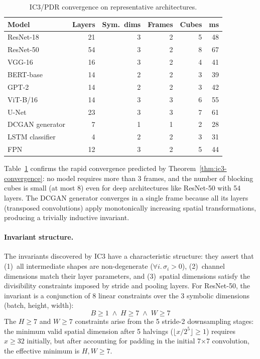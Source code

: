 \documentclass[10pt]{article}
\theoremstyle{plain}
\theoremstyle{definition}
\theoremstyle{remark}
\begin{document}
\begin{table}[t]
\centering
\caption{IC3/PDR convergence on representative architectures.}
\label{tab:ic3-convergence}
\small
\begin{tabular}{@{}lrrrrr@{}}
\toprule
\textbf{Model} & \textbf{Layers} & \textbf{Sym.\ dims} &
  \textbf{Frames} & \textbf{Cubes} & \textbf{ms} \\
\midrule
ResNet-18          & 21 & 3 & 2 & 5  & 48 \\
ResNet-50          & 54 & 3 & 2 & 8  & 67 \\
VGG-16             & 16 & 3 & 2 & 4  & 41 \\
BERT-base          & 14 & 2 & 2 & 3  & 39 \\
GPT-2              & 14 & 2 & 2 & 3  & 42 \\
ViT-B/16           & 14 & 3 & 3 & 6  & 55 \\
U-Net              & 23 & 3 & 3 & 7  & 61 \\
DCGAN generator    &  7 & 1 & 1 & 2  & 28 \\
LSTM classifier    &  4 & 2 & 2 & 3  & 31 \\
FPN                & 12 & 3 & 2 & 5  & 44 \\
\bottomrule
\end{tabular}
\end{table}

Table~\ref{tab:ic3-convergence} confirms the rapid convergence
predicted by Theorem~\ref{thm:ic3-convergence}: no model requires
more than 3 frames, and the number of blocking cubes is small
(at most 8) even for deep architectures like ResNet-50 with 54
layers.  The DCGAN generator converges in a single frame because
all its layers (transposed convolutions) apply monotonically
increasing spatial transformations, producing a trivially inductive
invariant.

\paragraph{Invariant structure.}
The invariants discovered by IC3 have a characteristic structure:
they assert that (1)~all intermediate shapes are non-degenerate
($\forall i.\, \sigma_i > 0$), (2)~channel dimensions match their
layer parameters, and (3)~spatial dimensions satisfy the
divisibility constraints imposed by stride and pooling layers.
For ResNet-50, the invariant is a conjunction of 8 linear constraints
over the 3 symbolic dimensions (batch, height, width):
\[
  B \geq 1 \;\land\; H \geq 7 \;\land\; W \geq 7
\]
The $H \geq 7$ and $W \geq 7$ constraints arise from the 5 stride-2
downsampling stages: the minimum valid spatial dimension after 5
halvings ($\lfloor x/2^5 \rfloor \geq 1$) requires $x \geq 32$
initially, but after accounting for padding in the initial 7$\times$7
convolution, the effective minimum is $H, W \geq 7$.
\end{document}
